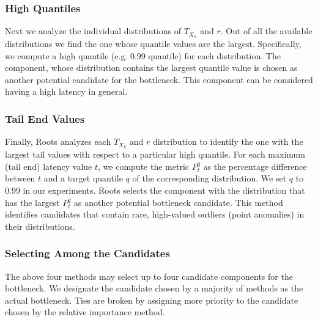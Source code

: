 \subsubsection{High Quantiles}
\label{sec:highquantile}
Next we analyze the individual distributions of $T_{X_n}$ and $r$. 
Out of all the available distributions
we find the one whose quantile values are the largest.
Specifically, we compute a high
quantile (e.g. 0.99 quantile) for each distribution. The component, whose distribution 
contains the largest quantile value
is chosen as another potential candidate for the bottleneck. This component can be considered
having a high latency in general.

\subsubsection{Tail End Values}
\label{sec:tailend}
Finally, Roots analyzes each $T_{X_k}$ and $r$ distribution to identify the one 
with the largest tail values with respect to a particular high quantile.
For each maximum (tail end) latency value $t$, we compute the metric $P^q_t$ 
as the percentage difference between $t$ and a target quantile
$q$ of the corresponding distribution. We set $q$ to 0.99 in our experiments.
Roots selects the component with the 
distribution that has the largest $P^q_t$ as another potential bottleneck candidate.
This method identifies
candidates that contain rare, high-valued outliers (point anomalies) in their distributions.

\subsubsection{Selecting Among the Candidates}
The above four methods may select up to four candidate components for the bottleneck. 
We designate 
the candidate chosen by a majority of methods as the actual bottleneck. Ties
are broken by assigning more priority to the candidate chosen by the relative importance
method.